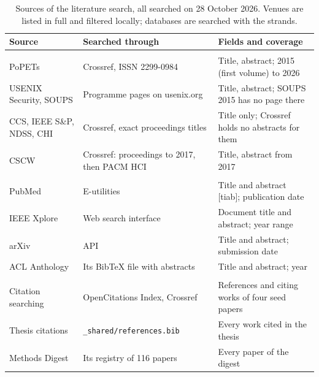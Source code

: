 \begin{table}[tbp]
\centering
\begin{singlespace}
\caption[Sources of the literature search]{Sources of the literature search, all
searched on 28 October 2026. Venues are listed in full and filtered locally;
databases are searched with the strands.}
\label{tab:lit-sources-method}
\small
\begin{tabularx}{\textwidth}{@{}>{\raggedright\arraybackslash}p{2.6cm}>{\raggedright\arraybackslash}p{3.9cm}>{\raggedright\arraybackslash}X@{}}
\toprule
\textbf{Source} & \textbf{Searched through} & \textbf{Fields and coverage} \\
\midrule
\multicolumn{3}{@{}l}{\textit{Venues}} \\
PoPETs & Crossref, ISSN 2299-0984 & Title, abstract; 2015 (first volume) to 2026 \\
USENIX Security, SOUPS & Programme pages on usenix.org & Title, abstract; SOUPS 2015 has no page there \\
CCS, IEEE S\&P, NDSS, CHI & Crossref, exact proceedings titles & Title only; Crossref holds no abstracts for them \\
CSCW & Crossref: proceedings to 2017, then PACM HCI & Title, abstract from 2017 \\
\addlinespace
\multicolumn{3}{@{}l}{\textit{Databases}} \\
PubMed & E-utilities & Title and abstract [tiab]; publication date \\
IEEE Xplore & Web search interface & Document title and abstract; year range \\
arXiv & API & Title and abstract; submission date \\
ACL Anthology & Its BibTeX file with abstracts & Title and abstract; year \\
\addlinespace
\multicolumn{3}{@{}l}{\textit{Other methods}} \\
Citation searching & OpenCitations Index, Crossref & References and citing works of four seed papers \\
Thesis citations & \texttt{\_shared/references.bib} & Every work cited in the thesis \\
Methods Digest & Its registry of 116 papers & Every paper of the digest \\
\bottomrule
\end{tabularx}
\end{singlespace}
\end{table}

